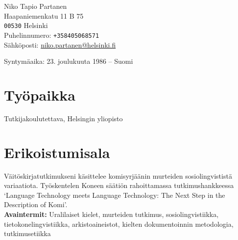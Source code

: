 \documentclass[11pt, a4paper]{article}
\begin{document}

{\LARGE Niko Tapio Partanen}\\[1cm] %
Haapaniemenkatu 11 B 75\\
\texttt{00530} Helsinki\\[.2cm]
Puhelinnumero: \texttt{+358405068571}\\ %
Sähköposti: \href{mailto:niko.partanen@kotus.fi}{niko.partanen@helsinki.fi}\\ %

\vspace{10mm}

Syntymäaika: 23. joulukuuta 1986 – Suomi\\ %


\section*{Työpaikka}

Tutkijakoulutettava, Helsingin yliopisto %

\section*{Erikoistumisala}

Väitöskirjatutkimukseni käsittelee komisyrjäänin murteiden sosiolingvististä variaatiota. Työskentelen Koneen säätiön rahoittamassa tutkimushankkeessa `Language Technology meets Language Technology: The Next Step in the Description of Komi'.\\

\textbf{Avaintermit:} Uralilaiset kielet, murteiden tutkimus, sosiolingvistiikka, tietokonelingvistiikka, arkistoaineistot, kielten dokumentoinnin metodologia, tutkimusetiikka %

\end{document}
